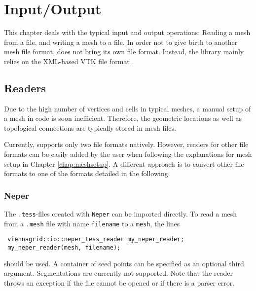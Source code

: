 \chapter{Input/Output} \label{chap:io}

This chapter deals with the typical input and output operations: Reading a mesh from a file, and writing a mesh to a file.
In order not to give birth to another mesh file format, {\ViennaGrid} does not bring its own file format.
Instead, the library mainly relies on the XML-based VTK \cite{VTK} file format \cite{VTKfileformat}.




\section{Readers}
Due to the high number of vertices and cells in typical meshes,
a manual setup of a mesh in code is soon inefficient. Therefore,
the geometric locations as well as topological connections are typically stored in mesh files.

Currently, {\ViennaGrid} supports only two file formats natively. However, readers for other file formats
can be easily added by the user when following the explanations for mesh setup in Chapter \ref{chap:meshsetup}.
A different approach is to convert other file formats to one of the formats detailed in the following.


 \subsection{Neper}
 The \texttt{.tess}-files created with \texttt{Neper} \cite{neper} can be imported directly.
 To read a mesh from a \texttt{.mesh} file with name \lstinline|filename| to a \lstinline|mesh|, the lines
 \begin{lstlisting}
 viennagrid::io::neper_tess_reader my_neper_reader;
 my_neper_reader(mesh, filename);
 \end{lstlisting}
 should be used. A container of seed points can be specified as an optional third argument.
 Segmentations are currently not supported.
 Note that the reader throws an exception if the file cannot be opened or if there is a parser error.


